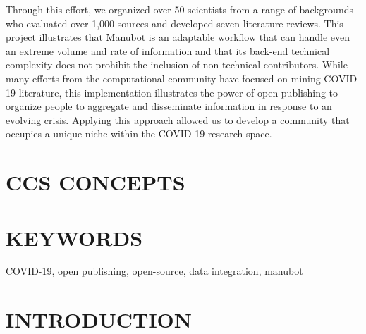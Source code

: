 \documentclass[twocolumn]{ceurart}
\begin{document}
Through this effort, we organized over 50 scientists from a range of backgrounds who evaluated over 1,000 sources and developed seven literature reviews.
This project illustrates that Manubot is an adaptable workflow that can handle even an extreme volume and rate of information and that its back-end technical complexity does not prohibit the inclusion of non-technical contributors.
While many efforts from the computational community have focused on mining COVID-19 literature, this implementation illustrates the power of open publishing to organize people to aggregate and disseminate information in response to an evolving crisis.
Applying this approach allowed us to develop a community that occupies a unique niche within the COVID-19 research space.

\hypertarget{ccs-concepts}{%
\section{CCS CONCEPTS}\label{ccs-concepts}}

\hypertarget{keywords}{%
\section{KEYWORDS}\label{keywords}}

COVID-19, open publishing, open-source, data integration, manubot

\hypertarget{introduction}{%
\section{INTRODUCTION}\label{introduction}}
\end{document}
